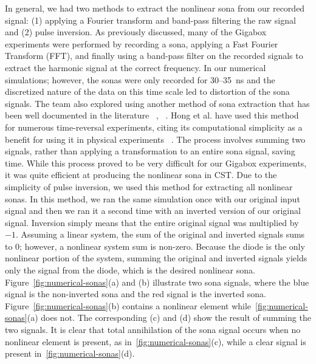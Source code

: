 In general, we had two methods to extract the nonlinear sona from our recorded signal: (1) applying a Fourier transform and band-pass filtering the raw signal and (2) pulse inversion. As previously discussed, many of the Gigabox experiments were performed by recording a sona, applying a Fast Fourier Transform (FFT), and finally using a band-pass filter on the recorded signals to extract the harmonic signal at the correct frequency. In our numerical simulations; however, the sonas were only recorded for \numrange{30}{35}~ns and the discretized nature of the data on this time scale led to distortion of the sona signals. The team also explored using another method of sona extraction that has been well documented in the literature ~\cite{simpson_pulse_1999}, ~\cite{hong_nonlinear_2014}. Hong et al. have used this method for numerous time-reversal experiments, citing its computational simplicity as a benefit for using it in physical experiments ~\cite{hong_nonlinear_2014}. The process involves summing two signals, rather than applying a transformation to an entire sona signal, saving time. While this process proved to be very difficult for our Gigabox experiments, it was quite efficient at producing the nonlinear sona in CST.
Due to the simplicity of pulse inversion, we used this method for extracting all nonlinear sonas. In this method, we ran the same simulation once with our original input signal and then we ran it a second time with an inverted version of our original signal. Inversion simply means that the entire original signal was multiplied by $-1$. Assuming a linear system, the sum of the original and inverted signals sums to $0$; however, a nonlinear system sum is non-zero. Because the diode is the only nonlinear portion of the system, summing the original and inverted signals yields only the signal from the diode, which is the desired nonlinear sona.  Figure~\ref{fig:numerical-sonas}(a) and (b) illustrate two sona signals, where the blue signal is the non-inverted sona and the red signal is the inverted sona. Figure~\ref{fig:numerical-sonas}(b) contains a nonlinear element while~\ref{fig:numerical-sonas}(a) does not. The corresponding (c) and (d) show the result of summing the two signals. It is clear that total annihilation of the sona signal occurs when no nonlinear element is present, as in~\ref{fig:numerical-sonas}(c), while a clear signal is present in~\ref{fig:numerical-sonas}(d).


